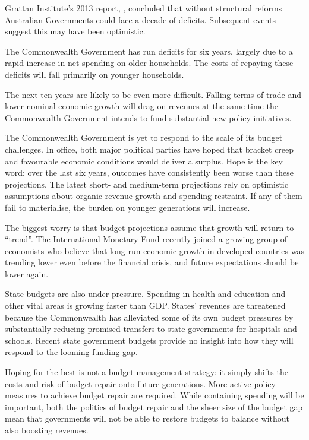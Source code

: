 \begin{overview}[-43pt]
Grattan Institute’s 2013 report, , concluded that without structural reforms Australian Governments could face a decade of deficits. Subsequent events suggest this may have been optimistic. 

The Commonwealth Government has run deficits for six years, largely due to a rapid increase in net spending on older households. The costs of repaying these deficits will fall primarily on younger households.

The next ten years are likely to be even more difficult. Falling terms of trade and lower nominal economic growth will drag on revenues at the same time the Commonwealth Government intends to fund substantial new policy initiatives. 

The Commonwealth Government is yet to respond to the scale of its budget challenges. In office, both major political parties have hoped that bracket creep and favourable economic conditions would deliver a surplus. Hope is the key word: over the last six years, outcomes have consistently been worse than these projections. The latest short- and medium-term projections rely on optimistic assumptions about organic revenue growth and spending restraint. If any of them fail to materialise, the burden on younger generations will increase. 

The biggest worry is that budget projections assume that growth will return to “trend”. The International Monetary Fund recently joined a growing group of economists who believe that long-run economic growth in developed countries was trending lower even before the financial crisis, and future expectations should be lower again.

State budgets are also under pressure. Spending in health and education and other vital areas is growing faster than GDP\@. States’ revenues are threatened because the Commonwealth has alleviated some of its own budget pressures by substantially reducing promised transfers to state governments for hospitals and schools. Recent state government budgets provide no insight into how they will respond to the looming funding gap. 

Hoping for the best is not a budget management strategy: it simply shifts the costs and risk of budget repair onto future generations. More active policy measures to achieve budget repair are required. While containing spending will be important, both the politics of budget repair and the sheer size of the budget gap mean that governments will not be able to restore budgets to balance without also boosting revenues.


\end{overview}

